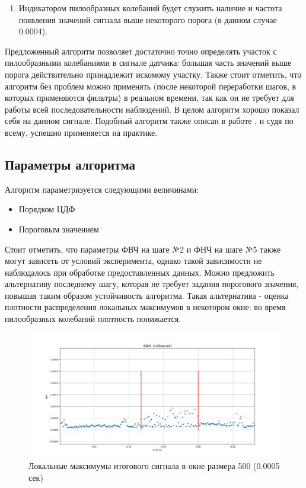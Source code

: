 \documentclass[12pt,a4paper]{article}
\begin{document}
\begin{enumerate}
				\item Индикатором пилообразных колебаний будет служить наличие и частота появления значений	сигнала выше некоторого порога (в данном случае 0.0004).
			\end{enumerate}
			
			Предложенный алгоритм позволяет достаточно точно определять участок	с пилообразными колебаниями в сигнале датчика: большая часть значений выше порога действительно принадлежит искомому участку. Также стоит отметить, что алгоритм без проблем можно применять (после некоторой переработки шагов, в которых применяются фильтры) в реальном времени, так как он не требует для работы всей последовательности наблюдений.	В целом алгоритм хорошо показал себя на данном сигнале. Подобный алгоритм также описан в работе \cite{Algoritm}, и судя по всему, успешно применяется на практике.
		
		\subsection{Параметры алгоритма}
			Алгоритм параметризуется следующими величинами:
			\begin{itemize}
				\item Порядком ЦДФ
				\item Пороговым значением
			\end{itemize}
		
			Стоит отметить, что параметры ФВЧ на шаге №2 и ФНЧ на шаге №5 также могут зависеть от условий эксперимента, однако такой зависимости не наблюдалось при обработке предоставленных данных. Можно предложить альтернативу последнему шагу, которая не требует задания порогового значения, повышая таким образом устойчивость алгоритма. Такая альтернатива - оценка плотности распределения локальных максимумов в некотором окне: во время пилообразных колебаний плотность понижается.
			
			\FloatBarrier
			\begin{figure}[h!]
				\centering\includegraphics[width=1\linewidth]{./../plots/sawtooth_alternative_detection.png}
				\caption{Локальные максимумы итогового сигнала в окне размера 500 (0.0005 сек)}
			\end{figure}
			\FloatBarrier	
		\newpage
		
\end{document}
